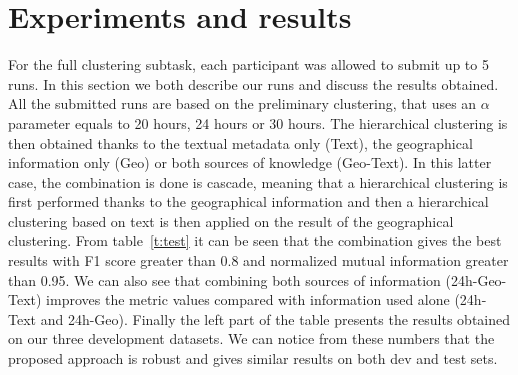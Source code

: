 \documentclass{acm_proc_article-me11_tweaked}
\begin{document}
\section{Experiments and results}
For the full clustering subtask, each participant was allowed to submit up to 5 runs. 
In this section we both describe our runs and discuss the results obtained.
All the submitted runs are based on the preliminary clustering, that uses an $\alpha$ parameter equals to 20 hours, 24 hours or 30 hours. The hierarchical clustering is then obtained thanks to the textual metadata only (Text), the geographical information only (Geo) or both sources of knowledge (Geo-Text). In this latter case, the combination is done is cascade, meaning that a hierarchical clustering is first performed thanks to the geographical information and then a hierarchical clustering based on text is then applied on the result of the geographical clustering.
From table~\ref{t:test} it can be seen that the combination gives the best results with F1 score greater than 0.8 and normalized mutual information greater than 0.95. We can also see that combining both sources of information (24h-Geo-Text) improves the metric values compared with information used alone (24h-Text and  24h-Geo). Finally the left part of the table presents the results obtained on our three development datasets. We can notice from these numbers that the proposed approach is robust and gives similar results on both dev and test sets.






\balancecolumns
\end{document}
